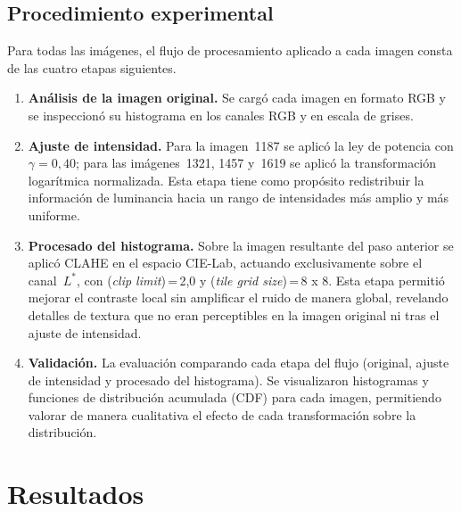 \documentclass[12pt,a4paper,twoside]{rho-class/rho}
\begin{document}
    \subsection{Procedimiento experimental}

        Para todas las imágenes, el flujo de procesamiento aplicado a cada imagen consta de las cuatro
        etapas siguientes.

        \begin{enumerate}
            \item \textbf{Análisis de la imagen original.} Se cargó cada imagen en
            formato RGB y se inspeccionó su histograma en los canales RGB y en
            escala de grises.

            \item \textbf{Ajuste de intensidad.} Para la
            imagen~1187 se aplicó la ley de potencia con $\gamma = 0{,}40$; para las
            imágenes~1321, 1457 y~1619 se aplicó la transformación logarítmica
            normalizada. Esta etapa tiene como propósito redistribuir la información de luminancia hacia un rango
            de intensidades más amplio y más uniforme.

            \item \textbf{Procesado del histograma.} Sobre la imagen
            resultante del paso anterior se aplicó CLAHE en el espacio CIE-Lab,
            actuando exclusivamente sobre el canal~$L^*$, con
            (\textit{clip limit})\,=\,2{,}0 y (\textit{tile grid size})\,=\,8 x 8. Esta etapa permitió
            mejorar el contraste local sin amplificar el ruido de manera global, revelando detalles de textura 
            que no eran perceptibles en la imagen original ni tras el ajuste de intensidad.

            \item \textbf{Validación.} La evaluación comparando cada etapa del flujo (original,
            ajuste de intensidad y procesado del histograma). Se visualizaron histogramas y funciones de
            distribución acumulada (CDF) para cada imagen, permitiendo valorar
            de manera cualitativa el efecto de cada transformación sobre la
            distribución.
        \end{enumerate}


\section{Resultados}
\end{document}
